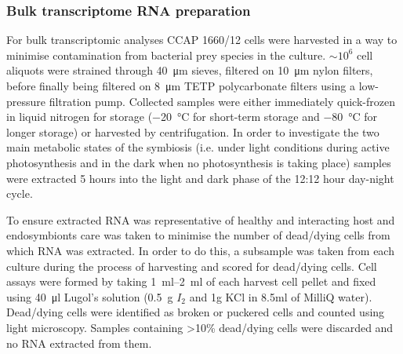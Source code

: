 \subsubsection{Bulk transcriptome RNA preparation}
For bulk transcriptomic analyses CCAP 1660/12 cells were harvested in a way to minimise 
contamination from bacterial prey species in the culture. \(\sim 10^{6}\) 
cell aliquots were strained through \SI{40}{\micro\metre} sieves, filtered on 
\SI{10}{\micro\metre} nylon filters, 
before finally being filtered on \SI{8}{\micro\metre} TETP polycarbonate filters using a 
low-pressure filtration pump.  Collected samples were either immediately 
quick-frozen in liquid nitrogen for storage (\SI{-20}{\degreeCelsius} for short-term storage 
and \SI{-80}{\degreeCelsius} for longer storage) or harvested by centrifugation.  
In order to investigate the two main metabolic states of the symbiosis 
(i.e. under light conditions during active photosynthesis and in the dark 
when no photosynthesis is taking place) samples were extracted 5 hours into 
the light and dark phase of the 12:12 hour day-night cycle.

To ensure extracted RNA was representative of healthy and interacting host 
and endosymbionts care was taken to minimise the number of dead/dying cells 
from which RNA was extracted.  In order to do this, a subsample was taken 
from each culture during the process of harvesting and scored for dead/dying cells.  
Cell assays were formed by taking \SIrange{1}{2}{\milli\litre} of each harvest cell pellet and 
fixed using \SI{40}{\micro\litre} Lugol's solution (\SI{0.5}{\gram} \(I_{2}\) and 1g KCl in 8.5ml 
of MilliQ water). Dead/dying cells were identified as broken or puckered cells 
and counted using light microscopy.  Samples containing >10\% dead/dying cells 
were discarded and no RNA extracted from them.

